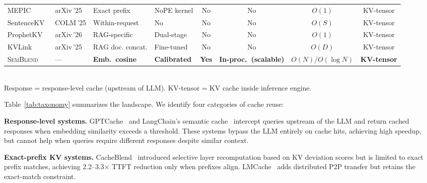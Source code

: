 \documentclass[10pt,twocolumn]{article}
\newcommand{\semblend}{\textsc{SemBlend}\xspace}
\begin{document}
\begin{table}[t]
\begin{tabular}{@{}llllcccc@{}}
MEPIC~\cite{mepic} & arXiv\,'25 & Exact prefix & NoPE kernel & No & No & $O(1)$ & KV-tensor \\
SentenceKV~\cite{sentencekv} & COLM\,'25 & Within-request & No & No & No & $O(S)$ & KV-tensor \\
ProphetKV~\cite{prophetkv} & arXiv\,'26 & RAG-specific & Dual-stage & No & No & $O(1)$ & KV-tensor \\
KVLink~\cite{kvlink} & arXiv\,'25 & RAG doc. concat. & Fine-tuned & No & No & $O(D)$ & KV-tensor \\
\midrule
\semblend & --- & \textbf{Emb.\ cosine} & \textbf{Calibrated} &
  \textbf{Yes} & \textbf{In-proc.\ (scalable)} & $O(N)$/$O(\log N)$ & \textbf{KV-tensor} \\
\bottomrule
\end{tabular}\\[2pt]
{\footnotesize Response = response-level cache (upstream of LLM).
KV-tensor = KV cache inside inference engine.}
\end{table}

Table~\ref{tab:taxonomy} summarizes the landscape. We identify four
categories of cache reuse:

\textbf{Response-level systems.}
GPTCache~\cite{gptcache} and LangChain's semantic cache~\cite{langchain}
intercept queries upstream of the LLM and return cached responses when
embedding similarity exceeds a threshold. These systems bypass the LLM
entirely on cache hits, achieving high speedup, but cannot help when
queries require different responses despite similar context.

\textbf{Exact-prefix KV systems.}
CacheBlend~\cite{cacheblend} introduced selective layer recomputation
based on KV deviation scores but is limited to exact prefix matches,
achieving 2.2--3.3$\times$ TTFT reduction only when prefixes align.
LMCache~\cite{lmcache} adds distributed P2P transfer but retains the
exact-match constraint.
\end{document}
